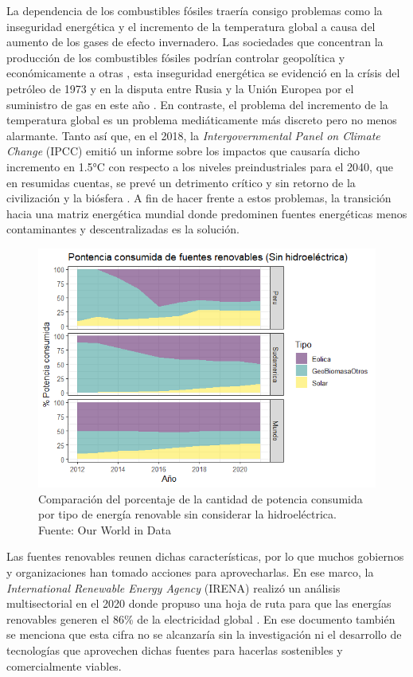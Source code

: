 
La dependencia de los combustibles fósiles traería consigo problemas como la inseguridad energética y el incremento de la temperatura global a causa del aumento de los gases de efecto invernadero. Las sociedades que concentran la producción de los combustibles fósiles podrían controlar geopolítica y económicamente a otras \cite{mayer2022fossil}, esta inseguridad energética se evidenció en la crísis del petróleo de 1973 \cite{vernon1976oil} y en la disputa entre Rusia y la Unión Europea por el suministro de gas en este año \cite{rodriguez2022improving}. En contraste, el problema del incremento de la temperatura global es un problema mediáticamente más discreto pero no menos alarmante. Tanto así que, en el 2018, la \textit{Intergovernmental Panel on Climate Change} (IPCC) emitió un informe sobre los impactos que causaría dicho incremento en 1.5°C con respecto a los niveles preindustriales para el 2040, que en resumidas cuentas, se prevé un detrimento crítico y sin retorno de la civilización y la biósfera \cite{guilyardi2018ipcc}. A fin de hacer frente a estos problemas, la transición hacia una matriz energética mundial donde predominen fuentes energéticas menos contaminantes y descentralizadas es la solución. 

\begin{figure}[!ht]
    \includegraphics[scale=0.85]{img/PorcentajeRenovable.png}
    \caption{Comparación del porcentaje de la cantidad de potencia consumida por tipo de energía renovable sin considerar la hidroeléctrica.
    Fuente: Our World in Data \cite{owidenergy}}
    \label{img:PorcentajeRenovable}
\end{figure}

Las fuentes renovables reunen dichas características, por lo que muchos gobiernos y organizaciones han tomado acciones para aprovecharlas. En ese marco, la \textit{International Renewable Energy Agency} (IRENA) realizó un análisis multisectorial en el 2020 donde propuso una hoja de ruta para que las energías renovables generen el 86\% de la electricidad global \cite{asmelash2020role}. En ese documento también se menciona que esta cifra no se alcanzaría sin la investigación ni el desarrollo de tecnologías que aprovechen dichas fuentes para hacerlas sostenibles y comercialmente viables.


